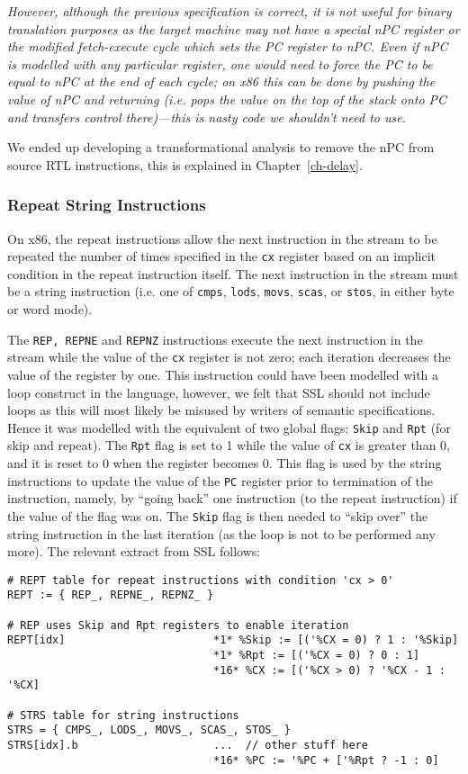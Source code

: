 {\it
However, although the previous specification is correct, it is not
useful for binary translation purposes as the target machine may
not have a special nPC register or the modified fetch-execute cycle
which sets the PC register to nPC.  Even if nPC is modelled with
any particular register, one would need to force the PC to be equal
to nPC at the end of each cycle; on x86 this can be done by 
pushing the value of nPC and returning (i.e. pops the value on
the top of the stack onto PC and transfers control there)---this
is nasty code we shouldn't need to use.

We ended up developing a transformational analysis to remove the 
nPC from source RTL instructions, this is explained in 
Chapter~\ref{ch-delay}. 
}


\subsubsection*{Repeat String Instructions}
On x86, the repeat instructions allow the next instruction in
the stream to be repeated the number of times specified in
the \texttt{cx} register based on an implicit condition in
the repeat instruction itself.  The next instruction in the stream
must be a string instruction (i.e. one of \texttt{cmps}, 
\texttt{lods}, \texttt{movs}, \texttt{scas}, or \texttt{stos}, 
in either byte or word mode).

The \texttt{REP, REPNE} and \texttt{REPNZ} instructions 
execute the next instruction in the stream while the value of
the \texttt{cx} register is not zero; each iteration decreases
the value of the register by one.
This instruction could have been modelled with a loop construct
in the language, however, we felt that SSL should not include
loops as this will most likely be misused by writers of 
semantic specifications.  Hence it was modelled with the
equivalent of two global flags: \texttt{Skip} and \texttt{Rpt} 
(for skip and repeat). 
The \texttt{Rpt} flag is set to 1 while the value of \texttt{cx} 
is greater than 0, and it is reset to 0 when the register 
becomes 0.  This flag is used by the string instructions to
update the value of the \texttt{PC} register prior to termination
of the instruction, namely, by ``going back'' one instruction
(to the repeat instruction) if the value of the flag was on.
The \texttt{Skip} flag is then needed to ``skip over'' the 
string instruction in the last iteration (as the loop is not
to be performed any more).
The relevant extract from SSL follows:  
{\small
\begin{verbatim}
# REPT table for repeat instructions with condition 'cx > 0'
REPT := { REP_, REPNE_, REPNZ_ }

# REP uses Skip and Rpt registers to enable iteration
REPT[idx]                       *1* %Skip := [('%CX = 0) ? 1 : '%Skip]
                                *1* %Rpt := [('%CX = 0) ? 0 : 1]
                                *16* %CX := [('%CX > 0) ? '%CX - 1 : '%CX]

# STRS table for string instructions 
STRS = { CMPS_, LODS_, MOVS_, SCAS_, STOS_ }
STRS[idx].b                     ...  // other stuff here 
                                *16* %PC := '%PC + ['%Rpt ? -1 : 0]
\end{verbatim}  
} 

